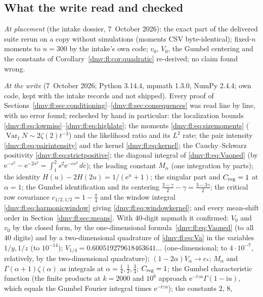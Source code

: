 \documentclass[11pt,letterpaper]{article}
\numberwithin{equation}{section}
\theoremstyle{definition}\newtheorem{definition}[theorem]{Definition}
\theoremstyle{remark}\newtheorem{remark}[theorem]{Remark}
\newcommand{\ii}{\mathrm i}
\newcommand{\ee}{\mathrm e}
\DeclareMathOperator{\Var}{Var}
\begin{document}
\subsection{What the write read and checked}\label{dmv:fl:sec:checks}

\emph{At placement} (the intake dossier, 7~October 2026): the exact part
of the delivered suite rerun on a copy without simulations (moments CSV
byte-identical); fixed-$n$ moments to $n=300$ by the intake's own code;
$v_0$, $V_0$, the Gumbel centering and the constants of
Corollary~\ref{dmv:fl:cor:quadratic} re-derived; no claim found wrong.

\emph{At the write} (7~October 2026; Python 3.14.4, mpmath 1.3.0,
NumPy 2.4.4; own code, kept with the intake records and not shipped). Every
proof of Sections~\ref{dmv:fl:sec:conditioning}--\ref{dmv:fl:sec:consequences}
was read line by line, with no error found; rechecked by hand in
particular: the localization bounds \eqref{dmv:fl:eq:lowmiss}--\eqref{dmv:fl:eq:highlate};
the moments \eqref{dmv:fl:eq:sizemoments} ($\Var_tN\sim2\zeta(2)t^{-3}$)
and the likelihood ratio and its $L^2$ rate; the pair intensity
\eqref{dmv:fl:eq:pairintensity} and the kernel \eqref{dmv:fl:eq:kernel};
the Cauchy--Schwarz positivity \eqref{dmv:fl:eq:strictpositive}; the
diagonal integral of \eqref{dmv:fl:eq:Vaoned} (by
$\ee^{-s^2}-\ee^{-2s^2}=\int_1^2s^2\ee^{-cs^2}\,dc$); the leading constant
$M_\alpha$ (one integration by parts); the identity
$H(u)-2H(2u)=1/(\ee^u+1)$; the singular part and $C_{\rm reg}=1$ at
$\alpha=1$; the Gumbel identification and its centering
$\tfrac{3-\gamma}2-\gamma=\tfrac{3-3\gamma}2$; the critical row covariance
$c_{1/2,1/2}=1-\tfrac\pi4$ and the window integral \eqref{dmv:fl:eq:harmonicwindow}
giving \eqref{dmv:fl:eq:windowkernel}; and every mean-shift order in
Section~\ref{dmv:fl:sec:means}. With 40-digit mpmath it confirmed: $V_0$
and $v_0$ by the closed form, by the one-dimensional
formula~\eqref{dmv:fl:eq:Vaoned} (to all 40 digits) and by a
two-dimensional quadrature of \eqref{dmv:fl:eq:Va} in the variables
$1/y,1/z$ (to $10^{-14}$); $V_{1/4}=0.600519279618463641\ldots$
(one-dimensional; to $4\cdot10^{-7}$, relatively, by the two-dimensional
quadrature);
$(1-2\alpha)V_\alpha\to c_*$; $M_\alpha$ and $\Gamma(\alpha+1)\zeta(\alpha)$
as integrals at $\alpha=\tfrac14,\tfrac12,\tfrac34$; $C_{\rm reg}=1$;
the Gumbel characteristic function (the finite products at $k=2000$ and
$10^6$ approach $\ee^{-\ii\gamma u}\Gamma(1-\ii u)$, which equals the
Gumbel Fourier integral times $\ee^{-\ii\gamma u}$); the constants $2$, $8$,
\end{document}
